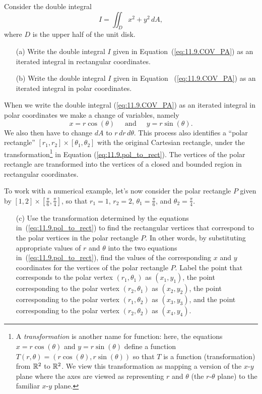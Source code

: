 \begin{pa} \label{PA:11.9} Consider the double integral
\begin{equation} \label{eq:11.9.COV_PA}
I = \iint_D x^2+y^2 \, dA,
\end{equation}
where $D$ is the upper half of the unit disk.
    \begin{enumerate}
    \item[(a)] Write the double integral $I$ given in Equation~(\ref{eq:11.9.COV_PA}) as an iterated integral in rectangular coordinates.

    \item[(b)] Write the double integral $I$ given in Equation~ (\ref{eq:11.9.COV_PA}) as an iterated integral in polar coordinates.


\end{enumerate}

\noindent When we write the double integral (\ref{eq:11.9.COV_PA}) as an iterated integral in polar coordinates we make a change of variables, namely
    \begin{equation}
x = r \cos(\theta)  \ \ \ \ \ \text{ and } \ \ \ \ \ y = r \sin(\theta).\label{eq:11.9.pol_to_rect}
\end{equation}
We also then have to change $dA$ to $r \, dr \, d\theta$. This process also identifies a ``polar rectangle'' $[r_1, r_2] \times [\theta_1, \theta_2]$ with the original Cartesian rectangle, under the transformation\footnote{A \emph{transformation} is another name for function:  here, the equations $x = r\cos(\theta)$ and $y = r\sin(\theta)$ define a function $T(r, \theta) = (r\cos(\theta), r\sin(\theta))$ so that $T$ is a function (transformation) from $\mathbb{R}^2$ to $\mathbb{R}^2$.  We view this transformation as mapping a version of the $x$-$y$ plane where the axes are viewed as representing $r$ and $\theta$ (the $r$-$\theta$ plane) to the familiar $x$-$y$ plane.} in Equation (\ref{eq:11.9.pol_to_rect}). The vertices of the polar rectangle are transformed into the vertices of a closed and bounded region in rectangular coordinates. 

\noindent To work with a numerical example, let's now consider the polar rectangle $P$ given by $[1, 2] \times [\frac{\pi}{6}, \frac{\pi}{4}]$, so that  $r_1 = 1$, $r_2=2$, $\theta_1 = \frac{\pi}{6}$, and $\theta_2 = \frac{\pi}{4}$. \\

    \begin{enumerate}
    \item[(c)] Use the transformation determined by the equations in~(\ref{eq:11.9.pol_to_rect}) to find the rectangular vertices that correspond to the polar vertices in the polar rectangle $P$. In other words, by substituting appropriate values of $r$ and $\theta$ into the two equations in~(\ref{eq:11.9.pol_to_rect}), find the values of the corresponding $x$ and $y$ coordinates for the vertices of the polar rectangle $P$. Label the point that corresponds to the polar vertex $(r_1, \theta_1)$ as $(x_1, y_1)$, the point corresponding to the polar vertex $(r_2, \theta_1)$ as $(x_2, y_2)$, the point corresponding to the polar vertex $(r_1, \theta_2)$ as $(x_3, y_3)$, and the point corresponding to the polar vertex $(r_2, \theta_2)$ as $(x_4, y_4)$.



\end{enumerate}
\end{pa}
